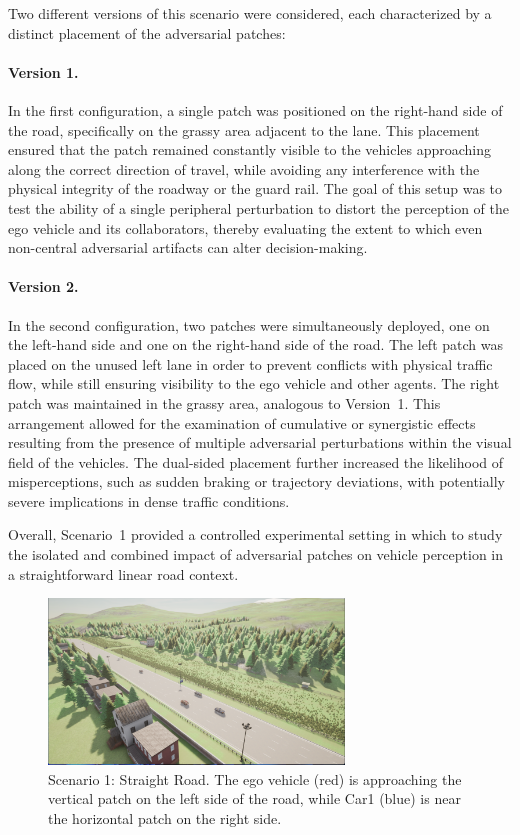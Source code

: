 Two different versions of this scenario were considered, each characterized by a distinct placement of the adversarial patches:

\paragraph{Version 1.}  
In the first configuration, a single patch was positioned on the right-hand side of the road, specifically on the grassy area adjacent to the lane.  
This placement ensured that the patch remained constantly visible to the vehicles approaching along the correct direction of travel, while avoiding any interference with the physical integrity of the roadway or the guard rail.  
The goal of this setup was to test the ability of a single peripheral perturbation to distort the perception of the ego vehicle and its collaborators, thereby evaluating the extent to which even non-central adversarial artifacts can alter decision-making.

\paragraph{Version 2.}  
In the second configuration, two patches were simultaneously deployed, one on the left-hand side and one on the right-hand side of the road.  
The left patch was placed on the unused left lane in order to prevent conflicts with physical traffic flow, while still ensuring visibility to the ego vehicle and other agents. The right patch was maintained in the grassy area, analogous to Version~1.  
This arrangement allowed for the examination of cumulative or synergistic effects resulting from the presence of multiple adversarial perturbations within the visual field of the vehicles. The dual-sided placement further increased the likelihood of misperceptions, such as sudden braking or trajectory deviations, with potentially severe implications in dense traffic conditions.

Overall, Scenario~1 provided a controlled experimental setting in which to study the isolated and combined impact of adversarial patches on vehicle perception in a straightforward linear road context.

\begin{figure}
    \centering
    \includegraphics[width=0.7\textwidth]{figures/experiments/scenario1.png}
    \caption{Scenario 1: Straight Road. The ego vehicle (red) is approaching the vertical patch on the left side of the road, while Car1 (blue) is near the horizontal patch on the right side.}
    \label{fig:scenario_straight_road}
\end{figure}

